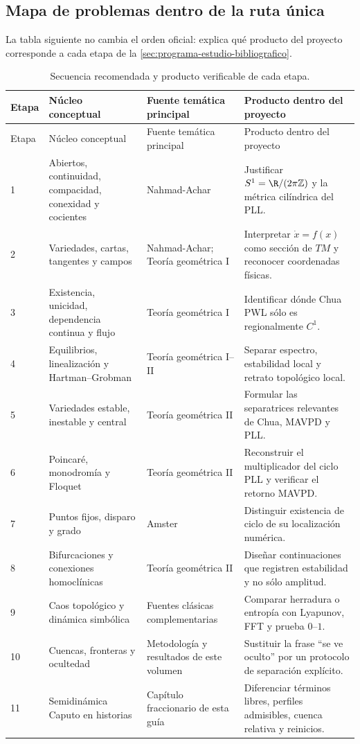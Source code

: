 \subsection{Mapa de problemas dentro de la ruta única}

La tabla siguiente no cambia el orden oficial: explica qué producto del
proyecto corresponde a cada etapa de la
\cref{sec:programa-estudio-bibliografico}.

\begin{longtable}{@{}L{1.05cm}L{3.0cm}L{4.1cm}L{5.45cm}@{}}
\caption{Secuencia recomendada y producto verificable de cada etapa.}
\label{tab:ruta-estudio-geometrica}\\
\toprule
Etapa & Núcleo conceptual & Fuente temática principal & Producto dentro del proyecto \\
\midrule
\endfirsthead
\toprule
Etapa & Núcleo conceptual & Fuente temática principal & Producto dentro del proyecto \\
\midrule
{} & Abiertos, continuidad, compacidad, conexidad y cocientes & Nahmad-Achar & Justificar $S^1=\R/(2\pi\mathbb Z)$ y la métrica cilíndrica del PLL. \\
2 & Variedades, cartas, tangentes y campos & Nahmad-Achar; Teoría geométrica I & Interpretar $\dot x=f(x)$ como sección de $TM$ y reconocer coordenadas físicas. \\
3 & Existencia, unicidad, dependencia continua y flujo & Teoría geométrica I & Identificar dónde Chua PWL sólo es regionalmente $C^1$. \\
4 & Equilibrios, linealización y Hartman--Grobman & Teoría geométrica I--II & Separar espectro, estabilidad local y retrato topológico local. \\
5 & Variedades estable, inestable y central & Teoría geométrica II & Formular las separatrices relevantes de Chua, MAVPD y PLL. \\
6 & Poincaré, monodromía y Floquet & Teoría geométrica II & Reconstruir el multiplicador del ciclo PLL y verificar el retorno MAVPD. \\
7 & Puntos fijos, disparo y grado & Amster & Distinguir existencia de ciclo de su localización numérica. \\
8 & Bifurcaciones y conexiones homoclínicas & Teoría geométrica II & Diseñar continuaciones que registren estabilidad y no sólo amplitud. \\
9 & Caos topológico y dinámica simbólica & Fuentes clásicas complementarias & Comparar herradura o entropía con Lyapunov, FFT y prueba $0$--$1$. \\
10 & Cuencas, fronteras y ocultedad & Metodología y resultados de este volumen & Sustituir la frase ``se ve oculto'' por un protocolo de separación explícito. \\
11 & Semidinámica Caputo en historias & Capítulo fraccionario de esta guía & Diferenciar términos libres, perfiles admisibles, cuenca relativa y reinicios. \\
\bottomrule
\end{longtable}


